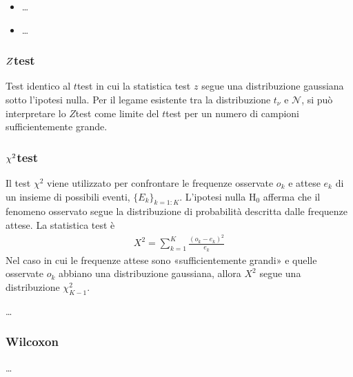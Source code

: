 \documentclass[letterpaper,10pt,italian]{jupyterBook}
\begin{document}
\sphinxAtStartPar
{}
\begin{itemize}
\item {} 
\sphinxAtStartPar
{} …

\item {} 
\sphinxAtStartPar
{} …

\end{itemize}


\subsubsection{\protect\(Z\protect\)\sphinxhyphen{}test}
\label{\detokenize{ch/statistics/hp-test-single:z-test}}
\sphinxAtStartPar
Test identico al \(t\)\sphinxhyphen{}test in cui la statistica test \(z\) segue una distribuzione gaussiana sotto l’ipotesi nulla. Per il legame esistente tra la distribuzione \(t_{\nu}\) e \(\mathscr{N}\), si può interpretare lo \(Z\)\sphinxhyphen{}test come limite del \(t\)\sphinxhyphen{}test per un numero di campioni sufficientemente grande.


\subsubsection{\protect\(\chi^2\protect\)\sphinxhyphen{}test}
\label{\detokenize{ch/statistics/hp-test-single:chi-2-test}}
\sphinxAtStartPar
Il test \(\chi^2\) viene utilizzato per confrontare le frequenze osservate \(o_k\) e attese \(e_k\) di un insieme di possibili eventi, \(\{ E_k \}_{k=1:K}\). L’ipotesi nulla \(\text{H}_0\) afferma che il fenomeno osservato segue la distribuzione di probabilità descritta dalle frequenze attese. La statistica test è
\begin{equation*}
\begin{split}X^2 = \sum_{k=1}^{K} \frac{(o_k - e_k)^2}{e_k}\end{split}
\end{equation*}
\sphinxAtStartPar
Nel caso in cui le frequenze attese sono «sufficientemente grandi» e quelle osservate \(o_k\) abbiano una distribuzione gaussiana, allora \(X^2\) segue una distribuzione \(\chi^2_{K-1}\).

\sphinxAtStartPar
… 


\subsubsection{Wilcoxon}
\label{\detokenize{ch/statistics/hp-test-single:wilcoxon}}
\sphinxAtStartPar
…
\end{document}
